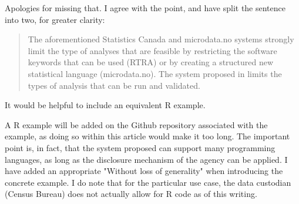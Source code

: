 \begin{response}
    Apologies for missing that. I agree with the point, and have split the sentence into two, for greater clarity:

    \begin{quote}
        The aforementioned Statistics Canada and microdata.no systems strongly limit the type of analyses that are feasible by restricting the software keywords that can be used (RTRA) or by creating a structured new statistical language (microdata.no). The system proposed in \citet{barrientos_providing_2018}  limits the types of analysis that can be run and validated. 
    \end{quote}
\end{response}

\begin{referee}
    It would be helpful to include an equivalent R example.
    \end{referee}

\begin{response}
    A R example will be added on the Github repository associated with the example, as doing so within this article would make it too long. The important point is, in fact, that the system proposed can support many programming languages, as long as the disclosure mechanism of the agency can be applied. I have added an appropriate "Without loss of generality" when introducing the concrete example. I do note that for the particular use case, the data custodian (Census Bureau) does not actually allow for R code as of this writing.
\end{response}


